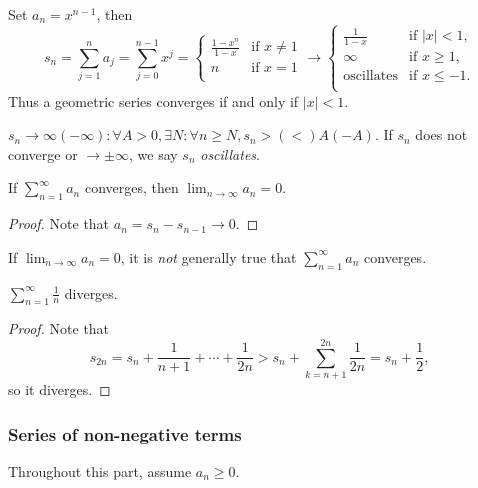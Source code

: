 \begin{example}
    Set $a_n=x^{n-1}$, then 
    \[
        s_n=\sum_{j=1}^{n}a_j=\sum_{j=0}^{n-1}x^j= \begin{cases}
        \frac{1-x^n}{1-x} &\text{if } x\neq 1\\
        n &\text{if }x=1\\
        \end{cases}
        \to \begin{cases}
            \frac{1}{1-x} &\text{if } |x|<1,\\
            \infty &\text{if } x\ge 1,\\
            \text{oscillates} &\text{if } x\le -1.\\
            \end{cases} 
    \]
    Thus a geometric series converges if and only if $|x|<1$.
\end{example}
\begin{note}
    $s_n\to \infty(-\infty): \forall A>0, \exists N: \forall n\ge N, s_n>(<)A(-A) $. If $s_n$ does not converge or $\to \pm \infty$, we say $s_n$ \textit{oscillates}.
\end{note}

\begin{lemma}\label{lma:1.7}
    If $ \sum_{n=1}^{\infty}a_n$ converges, then $ \lim_{n \to \infty} a_n=0$. 
\end{lemma}
\begin{proof}
    Note that $ a_n=s_{n}-s_{n-1}\to 0 $.
\end{proof}
\begin{remark}
    If $ \lim_{n \to \infty} a_n=0$, it is \textit{not} generally true that $ \sum_{n=1}^{\infty}a_n$ converges.
\end{remark}
\begin{sprop}
    $ \displaystyle \sum_{n=1}^{\infty}\frac{1}{n} $ diverges.
\end{sprop}
\begin{proof}
    Note that 
    \[
        s_{2n}=s_{n}+\frac{1}{n+1}+\cdots +\frac{1}{2n}>s_{n}+\sum_{k=n+1}^{2n}\frac{1}{2n}=s_n+\frac{1}{2},
    \]
    so it diverges.
\end{proof}

\subsubsection{Series of non-negative terms}
Throughout this part, assume $a_n\ge 0$.

